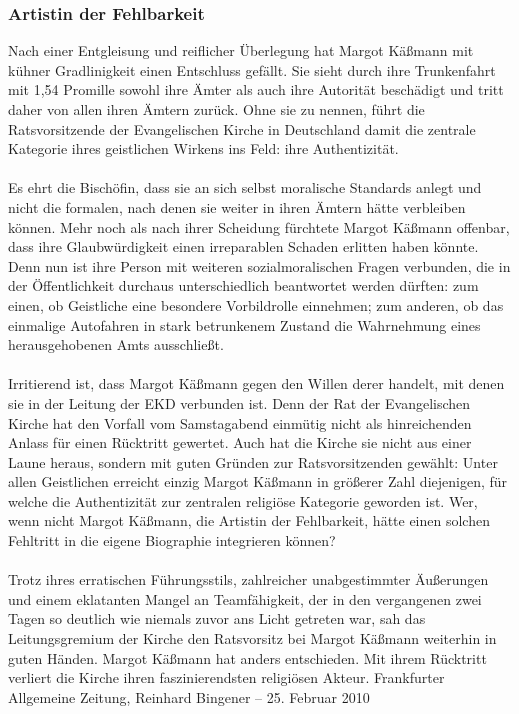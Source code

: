 \documentclass[a4paper,12pt,twoside]{scrbook}
\begin{document}
\subsubsection{Artistin der Fehlbarkeit}
Nach einer Entgleisung und reiflicher Überlegung hat Margot Käßmann mit kühner Gradlinigkeit einen Entschluss gefällt. Sie sieht durch ihre Trunkenfahrt mit 1,54 Promille sowohl ihre Ämter als auch ihre Autorität beschädigt und tritt daher von allen ihren Ämtern zurück. Ohne sie zu nennen, führt die Ratsvorsitzende der Evangelischen Kirche in Deutschland damit die zentrale Kategorie ihres geistlichen Wirkens ins Feld: ihre Authentizität.
\\\\
Es ehrt die Bischöfin, dass sie an sich selbst moralische Standards anlegt und nicht die formalen, nach denen sie weiter in ihren Ämtern hätte verbleiben können. Mehr noch als nach ihrer Scheidung fürchtete Margot Käßmann offenbar, dass ihre Glaubwürdigkeit einen irreparablen Schaden erlitten haben könnte. Denn nun ist ihre Person mit weiteren sozialmoralischen Fragen verbunden, die in der Öffentlichkeit durchaus unterschiedlich beantwortet werden dürften: zum einen, ob Geistliche eine besondere Vorbildrolle einnehmen; zum anderen, ob das einmalige Autofahren in stark betrunkenem Zustand die Wahrnehmung eines herausgehobenen Amts ausschließt.
\\\\
Irritierend ist, dass Margot Käßmann gegen den Willen derer handelt, mit denen sie in der Leitung der EKD verbunden ist. Denn der Rat der Evangelischen Kirche hat den Vorfall vom Samstagabend einmütig nicht als hinreichenden Anlass für einen Rücktritt gewertet. Auch hat die Kirche sie nicht aus einer Laune heraus, sondern mit guten Gründen zur Ratsvorsitzenden gewählt: Unter allen Geistlichen erreicht einzig Margot Käßmann in größerer Zahl diejenigen, für welche die Authentizität zur zentralen religiöse Kategorie geworden ist. Wer, wenn nicht Margot Käßmann, die Artistin der Fehlbarkeit, hätte einen solchen Fehltritt in die eigene Biographie integrieren können?
\\\\
Trotz ihres erratischen Führungsstils, zahlreicher unabgestimmter Äußerungen und einem eklatanten Mangel an Teamfähigkeit, der in den vergangenen zwei Tagen so deutlich wie niemals zuvor ans Licht getreten war, sah das Leitungsgremium der Kirche den Ratsvorsitz bei Margot Käßmann weiterhin in guten Händen. Margot Käßmann hat anders entschieden. Mit ihrem Rücktritt verliert die Kirche ihren faszinierendsten religiösen Akteur.
\newpage
Frankfurter Allgemeine Zeitung, Reinhard Bingener \hfill -- \hfill 25. Februar 2010
\end{document}

